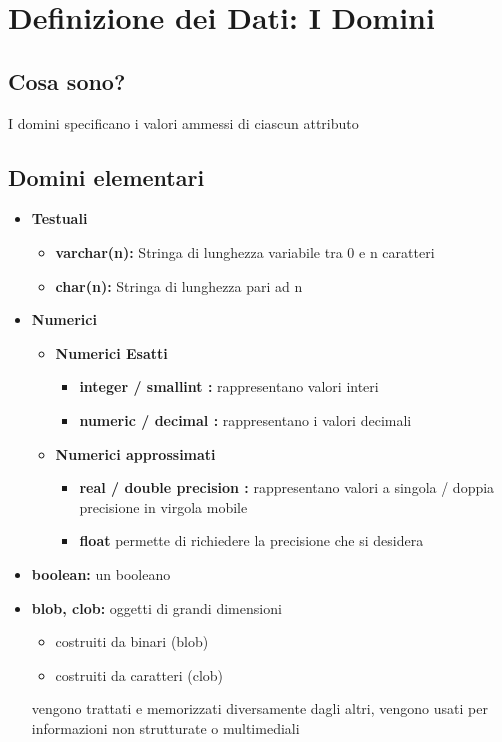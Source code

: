 \section{Definizione dei Dati: I Domini}
\subsection{Cosa sono?}
I domini specificano i valori ammessi di ciascun attributo
\subsection{Domini elementari}
\begin{itemize}
    \item \textbf{Testuali}
    \begin{itemize}
        \item \textbf{varchar(n):} Stringa di lunghezza variabile tra 0 e n caratteri
        \item \textbf{char(n):} Stringa di lunghezza pari ad n
    \end{itemize}
    \item \textbf{Numerici}
    \begin{itemize}
        \item \textbf{Numerici Esatti}
        \begin{itemize}
            \item \textbf{integer / smallint :} rappresentano valori interi
            \item \textbf{numeric / decimal :} rappresentano i valori decimali
        \end{itemize}
        \item \textbf{Numerici approssimati}
        \begin{itemize}
            \item \textbf{real / double precision :} rappresentano valori a singola / doppia precisione in virgola mobile
            \item \textbf{float} permette di richiedere la precisione che si desidera
        \end{itemize}
    \end{itemize}
    \item \textbf{boolean:} un booleano
    \item \textbf{blob, clob:} oggetti di grandi dimensioni
    \begin{itemize}
        \item costruiti da binari (blob)
        \item costruiti da caratteri (clob)
    \end{itemize}
    vengono trattati e memorizzati diversamente dagli altri, vengono usati per informazioni non strutturate o multimediali
\end{itemize}

